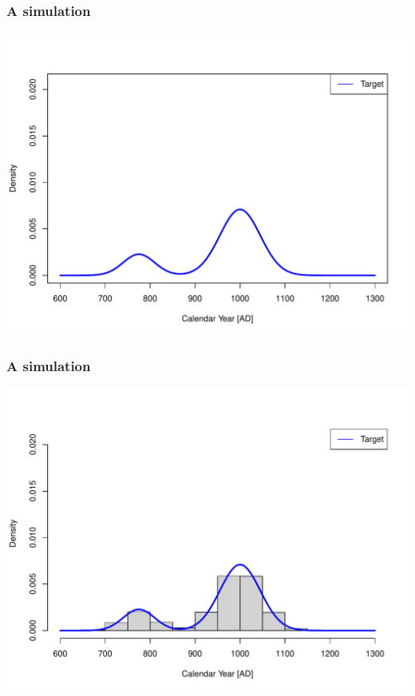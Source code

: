 \documentclass{beamer}
\begin{document}
\begin{frame}[t]
  \frametitle{A simulation}
    \includegraphics[height=.85\textheight]{sim_target.pdf}
\end{frame}

\begin{frame}[t]
  \frametitle{A simulation}
    \includegraphics[height=.85\textheight]{sim_target_with_hist.pdf}
\end{frame}
\end{document}
